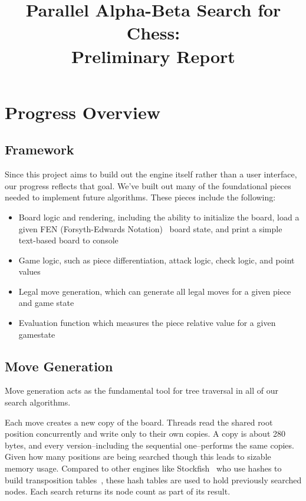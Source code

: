 \documentclass[10pt, conference, compsocconf]{IEEEtran}
\begin{document}
\title{Parallel Alpha-Beta Search for Chess:\\ Preliminary Report}

\author{
}

\maketitle

\section{Progress Overview}

\subsection*{Framework}

Since this project aims to build out the engine itself rather than a user interface, our progress reflects that goal. We've built out many of the foundational pieces needed to implement future algorithms. These pieces include the following:
\begin{itemize}
\item Board logic and rendering, including the ability to initialize the board, load a given FEN (Forsyth-Edwards Notation)~\cite{edwards1994} board state, and print a simple text-based board to console
\item Game logic, such as piece differentiation, attack logic, check logic, and point values~\cite{shannon1950}
\item Legal move generation, which can generate all legal moves for a given piece and game state
\item Evaluation function which measures the piece relative value for a given gamestate~\cite{shannon1950}
\end{itemize}

\subsection*{Move Generation}

Move generation acts as the fundamental tool for tree traversal in all of our search algorithms.

Each move creates a new copy of the board. Threads read the shared root position concurrently and write only to their own copies. A copy is about 280 bytes, and every version--including the sequential one--performs the same copies. Given how many positions are being searched though this leads to sizable memory usage. Compared to other engines like Stockfish~\cite{stockfish} who use hashes to build transposition tables~\cite{greenblatt1967, zobrist1970}, these hash tables are used to hold previously searched nodes. Each search returns its node count as part of its result.
\end{document}
